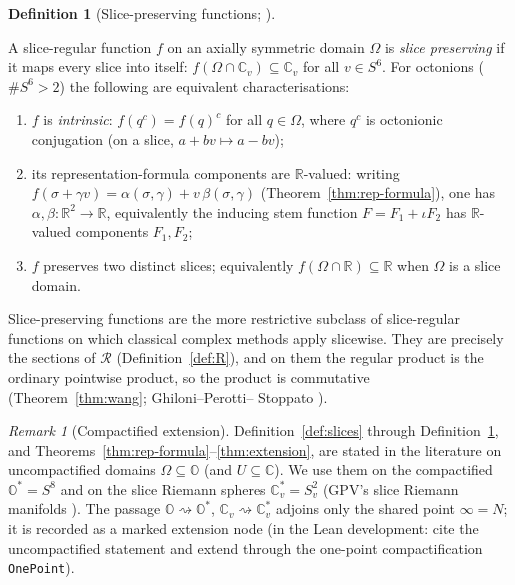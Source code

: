 \documentclass[11pt]{article}
\newcommand{\OO}{\mathbb{O}}
\newcommand{\CC}{\mathbb{C}}
\newcommand{\RR}{\mathbb{R}}
\newcommand{\Ostar}{\OO^{*}}
\providecommand{\lean}[1]{}
\providecommand{\uses}[1]{}
\theoremstyle{plain}
\theoremstyle{definition}
\newtheorem{definition}[theorem]{Definition}
\theoremstyle{remark}
\newtheorem{remark}[theorem]{Remark}
\begin{document}
\begin{definition}[Slice-preserving functions; ]\label{def:slice-preserving}
\lean{IsIntrinsic, StemRing.isIntrinsic, StemRing.real_on_real}
\uses{def:slice-regular, thm:rep-formula}
A slice-regular function $f$ on an axially symmetric domain $\Omega$ is \emph{slice
preserving} if it maps every slice into itself: $f(\Omega\cap\CC_v)\subseteq\CC_v$ for all
$v\in S^6$. For octonions ($\#S^6>2$) the following are equivalent characterisations:
\begin{enumerate}[leftmargin=2.4em]
\item[(i)] $f$ is \emph{intrinsic}: $f(q^{c})=f(q)^{c}$ for all $q\in\Omega$, where $q^{c}$
  is octonionic conjugation (on a slice, $a+bv\mapsto a-bv$);
\item[(ii)] its representation-formula components are $\RR$-valued: writing
  $f(\sigma+\gamma v)=\alpha(\sigma,\gamma)+v\,\beta(\sigma,\gamma)$
  (Theorem~\ref{thm:rep-formula}), one has $\alpha,\beta:\RR^2\to\RR$, equivalently the
  inducing stem function $F=F_1+\iota F_2$ has $\RR$-valued components $F_1,F_2$;
\item[(iii)] $f$ preserves two distinct slices; equivalently $f(\Omega\cap\RR)\subseteq\RR$
  when $\Omega$ is a slice domain.
\end{enumerate}
Slice-preserving functions are the more restrictive subclass of slice-regular functions on
which classical complex methods apply slicewise. They are precisely the sections of
$\mathcal R$ (Definition~\ref{def:R}), and on them the regular product is the ordinary
pointwise product, so the product is commutative (Theorem~\ref{thm:wang}; Ghiloni--Perotti--
Stoppato \cite[Rem.~1.8]{SeriesExp}).
\end{definition}

\begin{remark}[Compactified extension]\label{rmk:slice-pres-compact}
Definition~\ref{def:slices} through Definition~\ref{def:slice-preserving}, and
Theorems~\ref{thm:rep-formula}--\ref{thm:extension}, are stated in the literature on
uncompactified domains $\Omega\subseteq\OO$ (and $U\subseteq\CC$). We use them on the
compactified $\Ostar=S^8$ and on the slice Riemann spheres $\CC_v^{*}=S^2_v$ (GPV's slice
Riemann manifolds \cite{VS}). The passage $\OO\rightsquigarrow\Ostar$,
$\CC_v\rightsquigarrow\CC_v^{*}$ adjoins only the shared point $\infty=N$; it is recorded as
a marked extension node (in the Lean development: cite the uncompactified statement and
extend through the one-point compactification \texttt{OnePoint}).
\end{remark}
\end{document}
